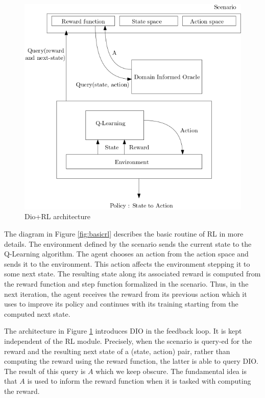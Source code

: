 \documentclass[a4paper,11pt]{article}
\theoremstyle{definition}
\begin{document}
\begin{figure}[H]
  \centering
  \includegraphics[scale=0.42]{dio.png}
  \caption{Dio+RL architecture}
  \label{fig:diorl}
\end{figure}

The diagram in Figure \ref{fig:basicrl} describes the basic routine of RL in more details. The environment defined by the scenario sends the current state 
to the Q-Learning algorithm. The agent chooses an action from the action space and sends it to the environment. This action affects the environment stepping it to some next state. 
The resulting state along its associated reward is computed from the reward function and step function formalized in the scenario. Thus, in the next iteration, the 
agent receives the reward from its previous action which it uses to improve its policy and continues with its training starting from the computed next state.  

\medskip 

The architecture in Figure \ref{fig:diorl} introduces DIO in the feedback loop. It is kept independent of the RL module. Precisely, when the scenario is query-ed for the reward and 
the resulting next state of a (state, action) pair, rather than computing the reward using the reward function, the latter is able to query DIO. The result of this query is $A$ which we keep 
obscure. The fundamental idea is that $A$ is used to inform the reward function when it is tasked with computing the reward. 
\end{document}
